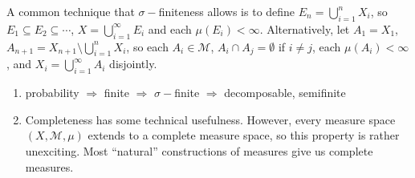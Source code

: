 \documentclass[11pt, a4paper]{memoir}
\theoremstyle{change}
\theoremstyle{plain}
\theoremstyle{nonumberplain}
\begin{document}
A common technique that $\sigma-$finiteness allows is to define $E_n=\bigcup_{i=1}^n X_i$, so $E_1\subseteq E_2\subseteq\cdots$, $X=\bigcup_{i=1}^\infty E_i$ and each $\mu(E_i)<\infty$.
Alternatively, let $A_1=X_1$, $A_{n+1}=X_{n+1}\setminus\bigcup_{i=1}^n X_i$, so each $A_i\in\mathcal{M}$, $A_i\cap A_j=\emptyset$ if $i\neq j$, each $\mu(A_i)<\infty$, and $X_i=\bigcup_{i=1}^\infty A_i$ disjointly.
\begin{enumerate}
    \item probability $\Rightarrow$ finite $\Rightarrow$ $\sigma-$finite $\Rightarrow$ decomposable, semifinite
    \item Completeness has some technical usefulness.
        However, every measure space $(X,\mathcal{M},\mu)$ extends to a complete measure space, so this property is rather unexciting.
        Most ``natural'' constructions of measures give us complete measures.
\end{enumerate}
\end{document}
